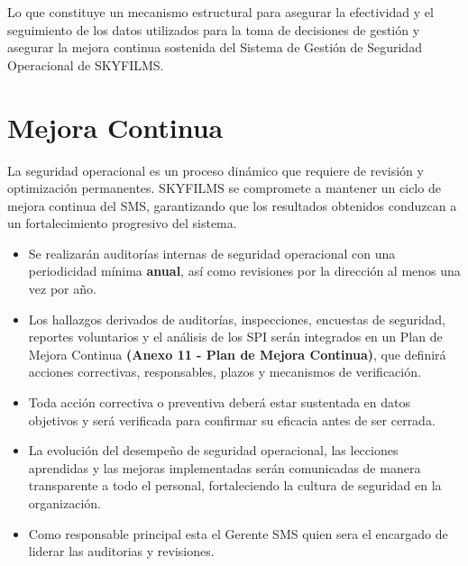 Lo que constituye un mecanismo estructural para asegurar la efectividad y el seguimiento de los datos utilizados para la toma de decisiones de gestión y asegurar la mejora continua sostenida del Sistema de Gestión de Seguridad Operacional de SKYFILMS.

\section{Mejora Continua}
La seguridad operacional es un proceso dinámico que requiere de revisión y optimización permanentes. SKYFILMS se compromete a mantener un ciclo de mejora continua del SMS, garantizando que los resultados obtenidos conduzcan a un fortalecimiento progresivo del sistema.

\begin{itemize}
    \item Se realizarán auditorías internas de seguridad operacional con una periodicidad mínima \textbf{anual}, así como revisiones por la dirección al menos una vez por año.
    \item Los hallazgos derivados de auditorías, inspecciones, encuestas de seguridad, reportes voluntarios y el análisis de los SPI serán integrados en un Plan de Mejora Continua \textbf{(Anexo 11 - Plan de Mejora Continua)}, que definirá acciones correctivas, responsables, plazos y mecanismos de verificación.
    \item Toda acción correctiva o preventiva deberá estar sustentada en datos objetivos y será verificada para confirmar su eficacia antes de ser cerrada.
    \item La evolución del desempeño de seguridad operacional, las lecciones aprendidas y las mejoras implementadas serán comunicadas de manera transparente a todo el personal, fortaleciendo la cultura de seguridad en la organización.
    \item Como responsable principal esta el Gerente SMS quien sera el encargado de liderar las auditorias y revisiones.
\end{itemize}

